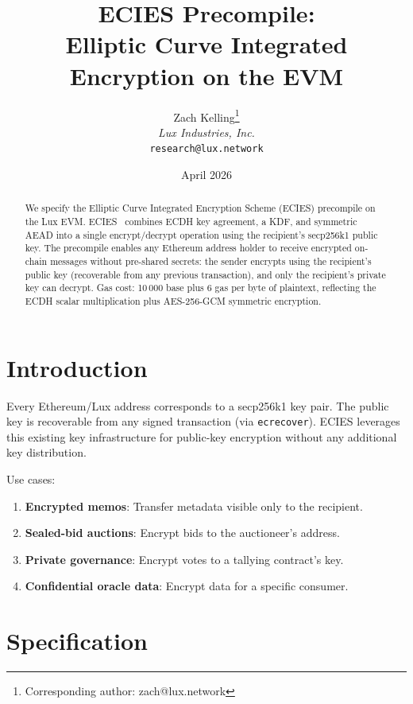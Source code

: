 \documentclass[11pt,a4paper]{article}
\title{ECIES Precompile:\\Elliptic Curve Integrated Encryption on the EVM}
\author{
Zach Kelling\thanks{Corresponding author: zach@lux.network}\\
\textit{Lux Industries, Inc.}\\
\texttt{research@lux.network}
}
\date{April 2026}
\begin{document}
\luxcoverpage

\begin{abstract}
We specify the Elliptic Curve Integrated Encryption Scheme (ECIES) precompile
on the Lux EVM. ECIES~\cite{ieee-ecies} combines ECDH key agreement, a KDF,
and symmetric AEAD into a single encrypt/decrypt operation using the recipient's
secp256k1 public key. The precompile enables any Ethereum address holder to
receive encrypted on-chain messages without pre-shared secrets: the sender
encrypts using the recipient's public key (recoverable from any previous
transaction), and only the recipient's private key can decrypt. Gas cost:
10\,000 base plus 6 gas per byte of plaintext, reflecting the ECDH scalar
multiplication plus AES-256-GCM symmetric encryption.
\end{abstract}

\section{Introduction}

Every Ethereum/Lux address corresponds to a secp256k1 key pair. The public key
is recoverable from any signed transaction (via \texttt{ecrecover}). ECIES
leverages this existing key infrastructure for public-key encryption without
any additional key distribution.

Use cases:
\begin{enumerate}[label=(\roman*)]
  \item \textbf{Encrypted memos}: Transfer metadata visible only to the recipient.
  \item \textbf{Sealed-bid auctions}: Encrypt bids to the auctioneer's address.
  \item \textbf{Private governance}: Encrypt votes to a tallying contract's key.
  \item \textbf{Confidential oracle data}: Encrypt data for a specific consumer.
\end{enumerate}

\section{Specification}
\end{document}
